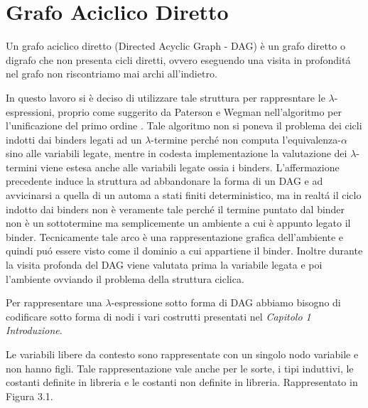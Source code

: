 \documentclass[12pt,a4paper,openright,twoside]{report}
\begin{document}
\clearpage{\pagestyle{empty}\cleardoublepage}
\chapter{Grafo Aciclico Diretto}                %
\lhead[\fancyplain{}{\bfseries\thepage}]{\fancyplain{}{\bfseries\rightmark}}

Un grafo aciclico diretto (Directed Acyclic Graph - DAG) \`e un grafo diretto o digrafo che non presenta cicli diretti, ovvero eseguendo una visita in profondit\'a nel grafo non riscontriamo mai archi all'indietro. \newline

In questo lavoro si \`e deciso di utilizzare tale struttura per rappresntare le $\lambda$-espressioni, proprio come suggerito da Paterson e Wegman nell'algoritmo per l'unificazione del primo ordine \cite{K3}. Tale algoritmo non si poneva il problema dei cicli indotti dai binders legati ad un $\lambda$-termine perch\'e non computa l'equivalenza-$\alpha$ sino alle variabili legate, mentre in codesta implementazione la valutazione dei $\lambda$-termini viene estesa anche alle variabili legate ossia i binders.\newline
L'affermazione precedente induce la struttura ad abbandonare la forma di un DAG e ad avvicinarsi a quella di un automa a stati finiti deterministico, ma in realt\'a il ciclo indotto dai binders non \`e veramente tale perch\'e il termine puntato dal binder non \`e un sottotermine ma semplicemente un ambiente a cui \`e appunto legato il binder. Tecnicamente tale arco \`e una rappresentazione grafica dell'ambiente e quindi pu\'o essere visto come il dominio a cui appartiene il binder. Inoltre durante la visita profonda del DAG viene valutata prima la variabile legata e poi l'ambiente ovviando il problema della struttura ciclica.

Per rappresentare una $\lambda$-espressione sotto forma di DAG abbiamo bisogno di codificare sotto forma di nodi i vari costrutti presentati nel \textit{Capitolo 1 Introduzione}.\newline

Le variabili libere da contesto sono rappresentate con un singolo nodo variabile e non hanno figli. Tale rappresentazione vale anche per le sorte, i tipi induttivi, le costanti definite in libreria e le costanti non definite in libreria. Rappresentato in Figura 3.1.\newline
\end{document}
